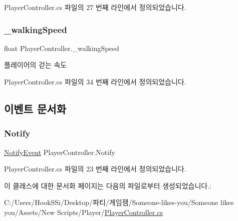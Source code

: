 Player\+Controller.\+cs 파일의 27 번째 라인에서 정의되었습니다.

\mbox{\label{class_player_controller_a1ab6a7892eecf1a9fa7b1a49842a3dd2}} 
\subsubsection{\texorpdfstring{\_walkingSpeed}{\_walkingSpeed}}
{\footnotesize\ttfamily float Player\+Controller.\+\_\+walking\+Speed}



플레이어의 걷는 속도 



Player\+Controller.\+cs 파일의 34 번째 라인에서 정의되었습니다.



\subsection{이벤트 문서화}
\mbox{\label{class_player_controller_af13292e01756741118500035511fc88d}} 
\subsubsection{\texorpdfstring{Notify}{Notify}}
{\footnotesize\ttfamily \mbox{\hyperlink{class_player_controller_a934c7f80b80276620cd60eaaeea7520e}{Notify\+Event}} Player\+Controller.\+Notify\hspace{0.3cm}{\ttfamily [static]}}



Player\+Controller.\+cs 파일의 23 번째 라인에서 정의되었습니다.



이 클래스에 대한 문서화 페이지는 다음의 파일로부터 생성되었습니다.\+:\begin{DoxyCompactItemize}
\item 
C\+:/\+Users/\+Hook\+S\+Si/\+Desktop/파티/게임잼/\+Someone-\/likes-\/you/\+Someone likes you/\+Assets/\+New Scripts/\+Player/\mbox{\hyperlink{_player_controller_8cs}{Player\+Controller.\+cs}}\end{DoxyCompactItemize}
